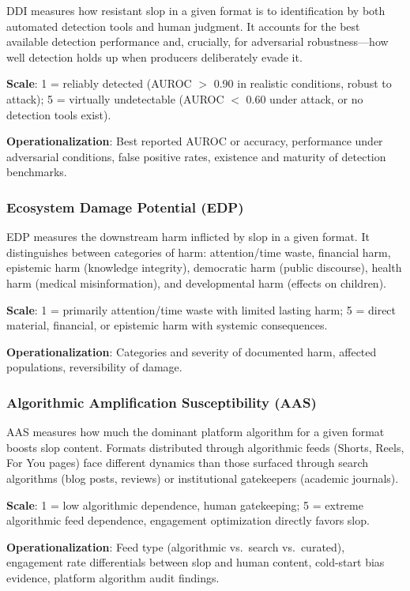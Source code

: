 \documentclass[12pt,a4paper]{article}
\begin{document}
DDI measures how resistant slop in a given format is to identification by both automated detection tools and human judgment. It accounts for the best available detection performance and, crucially, for adversarial robustness---how well detection holds up when producers deliberately evade it.

\textbf{Scale}: 1 = reliably detected (AUROC $>$ 0.90 in realistic conditions, robust to attack); 5 = virtually undetectable (AUROC $<$ 0.60 under attack, or no detection tools exist).

\textbf{Operationalization}: Best reported AUROC or accuracy, performance under adversarial conditions, false positive rates, existence and maturity of detection benchmarks.

\subsubsection{Ecosystem Damage Potential (EDP)}

EDP measures the downstream harm inflicted by slop in a given format. It distinguishes between categories of harm: attention/time waste, financial harm, epistemic harm (knowledge integrity), democratic harm (public discourse), health harm (medical misinformation), and developmental harm (effects on children).

\textbf{Scale}: 1 = primarily attention/time waste with limited lasting harm; 5 = direct material, financial, or epistemic harm with systemic consequences.

\textbf{Operationalization}: Categories and severity of documented harm, affected populations, reversibility of damage.

\subsubsection{Algorithmic Amplification Susceptibility (AAS)}

AAS measures how much the dominant platform algorithm for a given format boosts slop content. Formats distributed through algorithmic feeds (Shorts, Reels, For You pages) face different dynamics than those surfaced through search algorithms (blog posts, reviews) or institutional gatekeepers (academic journals).

\textbf{Scale}: 1 = low algorithmic dependence, human gatekeeping; 5 = extreme algorithmic feed dependence, engagement optimization directly favors slop.

\textbf{Operationalization}: Feed type (algorithmic vs.\ search vs.\ curated), engagement rate differentials between slop and human content, cold-start bias evidence, platform algorithm audit findings.
\end{document}

